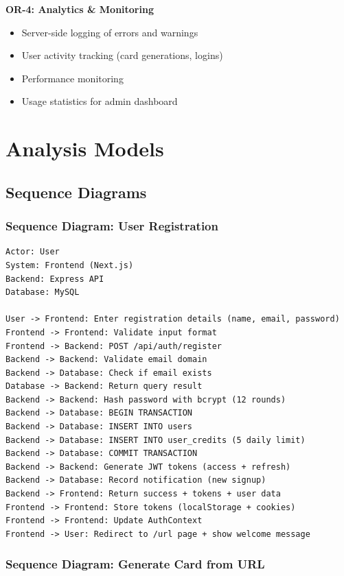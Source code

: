 \documentclass[12pt,a4paper]{article}
\begin{document}
\textbf{OR-4: Analytics \& Monitoring}
\begin{itemize}
    \item Server-side logging of errors and warnings
    \item User activity tracking (card generations, logins)
    \item Performance monitoring
    \item Usage statistics for admin dashboard
\end{itemize}

\newpage

\section{Analysis Models}

\subsection{Sequence Diagrams}

\subsubsection{Sequence Diagram: User Registration}

\begin{verbatim}
Actor: User
System: Frontend (Next.js)
Backend: Express API
Database: MySQL

User -> Frontend: Enter registration details (name, email, password)
Frontend -> Frontend: Validate input format
Frontend -> Backend: POST /api/auth/register
Backend -> Backend: Validate email domain
Backend -> Database: Check if email exists
Database -> Backend: Return query result
Backend -> Backend: Hash password with bcrypt (12 rounds)
Backend -> Database: BEGIN TRANSACTION
Backend -> Database: INSERT INTO users
Backend -> Database: INSERT INTO user_credits (5 daily limit)
Backend -> Database: COMMIT TRANSACTION
Backend -> Backend: Generate JWT tokens (access + refresh)
Backend -> Database: Record notification (new signup)
Backend -> Frontend: Return success + tokens + user data
Frontend -> Frontend: Store tokens (localStorage + cookies)
Frontend -> Frontend: Update AuthContext
Frontend -> User: Redirect to /url page + show welcome message
\end{verbatim}

\subsubsection{Sequence Diagram: Generate Card from URL}
\end{document}
